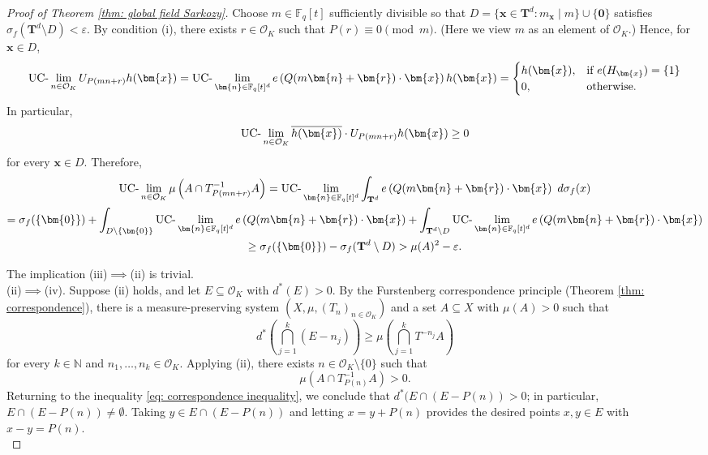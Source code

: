 \documentclass{amsart}
\theoremstyle{definition}
\numberwithin{equation}{section}
\newcommand{\N}{\mathbb{N}}
\newcommand{\F}{\mathbb{F}}
\newcommand{\mO}{\mathcal{O}}
\newcommand{\es}{\emptyset}
\newcommand{\eps}{\varepsilon}
\newcommand{\UClim}{\textup{UC-}\lim}
\begin{document}
\begin{proof}[Proof of Theorem \ref{thm: global field Sarkozy}]
	Choose $m \in \F_q[t]$ sufficiently divisible so that $D = \{\bm{x} \in \mathbf{T}^d : m_{\bm{x}} \mid m\} \cup \{\bm{0}\}$ satisfies $\sigma_f(\mathbf{T}^d \setminus D) < \eps$.
	By condition (i), there exists $r \in \mO_K$ such that $P(r) \equiv 0 \pmod{m}$.
    (Here we view $m$ as an element of $\mO_K$.)
    Hence, for $\bm{x} \in D$,
    \begin{equation*}
        \UClim_{n \in \mO_K} U_{P(mn+r)}h(\bm{x}) = \UClim_{\bm{n} \in \F_q[t]^d} e \left( Q(m\bm{n}+\bm{r}) \cdot \bm{x} \right) h(\bm{x}) = \begin{cases}
		 	h(\bm{x}), & \text{if}~e(H_{\bm{x}}) = \{1\} \\
			0, & \text{otherwise}.
		 \end{cases}
	\end{equation*}
	In particular,
	\begin{equation*}
        \UClim_{n \in \mO_K} \overline{h(\bm{x})} \cdot U_{P(mn+r)}h(\bm{x}) \ge 0
	\end{equation*}
	for every $\bm{x} \in D$.
	Therefore,
	\begin{multline*}
		\UClim_{n \in \mO_K} \mu \left( A \cap T_{P(mn+r)}^{-1}A \right)
		 = \UClim_{\bm{n} \in \F_q[t]^d} \int_{\mathbf{T}^d}{e \left( Q(m\bm{n}+\bm{r}) \cdot \bm{x} \right)~d\sigma_f(x)} \\
		= \sigma_f(\{\bm{0}\})
		 + \int_{D \setminus \{\bm{0}\}}{\UClim_{\bm{n} \in \F_q[t]^d} e \left( Q(m\bm{n}+\bm{r}) \cdot \bm{x} \right)}
		+ \int_{\mathbf{T}^d \setminus D}{\UClim_{\bm{n} \in \F_q[t]^d} e \left( Q(m \bm{n} + \bm{r}) \cdot \bm{x} \right)} \\
		\ge \sigma_f(\{\bm{0}\}) - \sigma_f(\mathbf{T}^d \setminus D) > \mu(A)^2 - \eps.
	\end{multline*}
    
    The implication (iii)$\implies$(ii) is trivial. \\
    
    (ii)$\implies$(iv).
    Suppose (ii) holds, and let $E \subseteq \mO_K$ with $d^*(E) > 0$.
    By the Furstenberg correspondence principle (Theorem \ref{thm: correspondence}), there is a measure-preserving system $(X, \mu, (T_n)_{n\in \mO_K})$ and a set $A \subseteq X$ with $\mu(A) > 0$ such that
    \begin{equation} \label{eq: correspondence inequality}
        d^* \left( \bigcap_{j=1}^k (E - n_j) \right) \ge \mu \left( \bigcap_{j=1}^k T^{-n_j}A \right)
    \end{equation}
    for every $k \in \N$ and $n_1, \dots, n_k \in \mO_K$.
    Applying (ii), there exists $n \in \mO_K \setminus \{0\}$ such that
    \begin{equation*}
        \mu \left( A \cap T_{P(n)}^{-1}A \right) > 0.
    \end{equation*}
    Returning to the inequality \eqref{eq: correspondence inequality}, we conclude that $d^*(E \cap (E - P(n)) > 0$; in particular, $E \cap (E - P(n)) \ne \es$.
    Taking $y \in E \cap (E - P(n))$ and letting $x = y + P(n)$ provides the desired points $x,y \in E$ with $x-y = P(n)$. \\
    

\end{proof}
\end{document}
